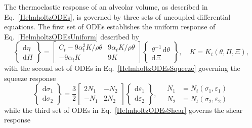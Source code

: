 The thermo\-elastic response of an alveolar volume, as described in Eq.~\ref{HelmholtzODEs}, is governed by three sets of uncoupled differential equations.  The first set of ODEs establishes the uniform response of Eq.~\ref{HelmholtzODEsUniform} described by
\begin{displaymath}
\left\{ \begin{matrix}
\mathrm{d} \eta \\ \mathrm{d} \Pi 
\end{matrix} \right\} = \begin{bmatrix}
C_t - 9 \alpha^2_t K / \rho \theta & 9 \alpha_t K / \rho \theta \\
-9 \alpha_t K & 9K
\end{bmatrix} \left\{ \begin{matrix}
\theta^{-1} \, \mathrm{d} \theta \\ \mathrm{d} \Xi 
\end{matrix} \right\} , \quad
K = K_t ( \theta , \Pi , \Xi ),
\end{displaymath}
with the second set of ODEs in Eq.~\ref{HelmholtzODEsSqueeze} governing the squeeze response
\begin{displaymath}
\left\{ \begin{matrix}
\mathrm{d} \sigma_1 \\ \mathrm{d} \sigma_2
\end{matrix} \right\} = \frac{3}{2} \begin{bmatrix}
2 N_1 & -N_2 \\
-N_1 & 2N_2
\end{bmatrix} \left\{ \begin{matrix}
\mathrm{d} \varepsilon_1 \\ \mathrm{d} \varepsilon_2
\end{matrix} \right\} , \quad
\begin{aligned}
N_1 & = N_t ( \sigma_1 , \varepsilon_1 ) \\
N_2 & = N_t ( \sigma_2 , \varepsilon_2 )
\end{aligned}
\end{displaymath}
while the third set of ODEs in Eq.~\ref{HelmholtzODEsShear} governs the shear response
